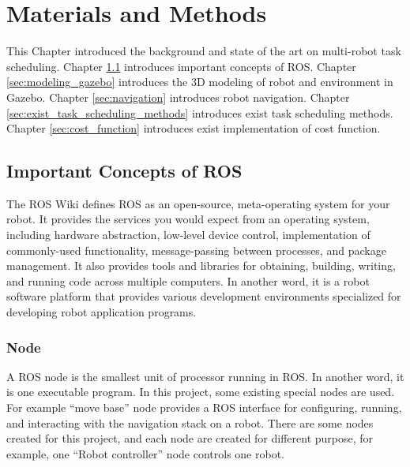 \chapter{Materials and Methods}




This Chapter introduced the background and state of the art on multi-robot task scheduling. Chapter \ref{sec:ros_concepts} introduces important concepts of ROS. Chapter \ref{sec:modeling_gazebo} introduces the 3D modeling of robot and environment in Gazebo. Chapter \ref{sec:navigation} introduces robot navigation. Chapter \ref{sec:exist_task_scheduling_methods} introduces exist task scheduling methods. Chapter \ref{sec:cost_function} introduces exist implementation of cost function.

\section{Important Concepts of ROS}
\label{sec:ros_concepts}
The ROS Wiki \cite{ROSWEB} defines ROS as an open-source, meta-operating system for your robot. It provides the services you would expect from an operating system, including hardware abstraction, low-level device control, implementation of commonly-used functionality, message-passing between processes, and package management. It also provides tools and libraries for obtaining, building, writing, and running code across multiple computers.
In another word, it is a robot software platform that provides various development environments specialized for developing robot application programs\cite{Pyo17}.

\subsection{Node}
A ROS node is the smallest unit of processor running in ROS. In another word, it is one executable program. In this project, some existing special nodes are used. For example ``move base'' node provides a ROS interface for configuring, running, and interacting with the navigation stack on a robot. There are some nodes created for this project, and each node are created for different purpose, for example, one ``Robot controller'' node controls one robot. 

